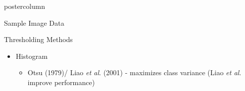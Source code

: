 \documentclass[final]{beamer}
\begin{document}
\begin{frame}
\begin{columns}
\begin{column}{.33\textwidth}
\begin{beamercolorbox}[center,wd=\textwidth]{postercolumn}
\begin{minipage}[T]{.95\textwidth}
{\begin{block}{Sample Image Data}
\begin{figure}
                 \quad
                \label{fig:origdata}
              \end{figure}
            \end{block}
            \vfill
            \begin{block}{Thresholding Methods}
              \begin{itemize}
              	\item Histogram
			\begin{itemize}
				\item Otsu (1979)/ Liao \emph{et al}. (2001) - maximizes class variance (Liao \emph{et al}. improve performance)

\end{itemize}
\end{itemize}
\end{block}}
\end{minipage}
\end{beamercolorbox}
\end{column}
\end{columns}
\end{frame}
\end{document}
